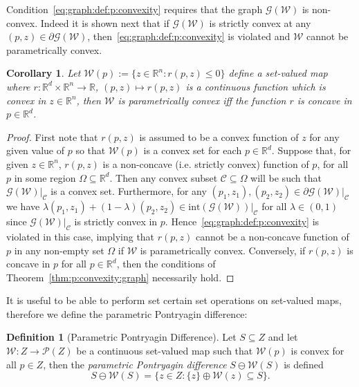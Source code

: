 \documentclass{elsarticle}
\newcounter{thmcount}
\newtheorem{cor}[thmcount]{Corollary}
\theoremstyle{remark}
\theoremstyle{definition}
\newtheorem{defi}[thmcount]{Definition}
\begin{document}
Condition~\eqref{eq:graph:def:p:convexity} requires that the graph $\mathscr G(\mathcal W)$ is non-convex.
%
Indeed it is shown next that if $\mathscr G(\mathcal W)$ is strictly convex at any $(p,z)\in\partial \mathscr G (\mathcal W)$, then~\eqref{eq:graph:def:p:convexity} is violated and 
$\mathcal W$ cannot be parametrically convex.

%
\begin{cor}\label{thm:inequalities:convex:concave}
%
Let $\mathcal W(p):=\{z\in\mathbb R^n: r(p,z)\leq0\}$ define a set-valued
map where 
$r: \mathbb R^d \times\mathbb R^n \rightarrow \mathbb R$, $(p,z)\mapsto r(p,z)$ is a continuous function which is convex in $z \in\mathbb R^n$, 
then $\mathcal W$ is parametrically
convex iff the function $r$ is concave in $p\in\mathbb R^d$.
%
\end{cor}
%
\begin{proof}
First note that $r(p,z)$ is assumed to be a convex function of $z$ for any given value of $p$ so that $\mathcal W(p)$ is a convex set for each $p\in\mathbb R^d$.
%
Suppose that, for given $z\in\mathbb R^n$, $r(p,z)$ is a non-concave (i.e. 
strictly convex) function of $p$, for all $p$ in some region $\Omega\subseteq\mathbb R^d$. 
%
Then any convex subset $\mathcal C\subseteq\Omega$ will be such that $\mathscr 
G(\mathcal W)\vert_{\mathcal C}$ is a convex set.
%
Furthermore, for any $(p_1,z_1),(p_2,z_2)\in \partial\mathscr G(\mathcal W)\vert_{\mathcal C}$ we have
$\lambda (p_1,z_1) + (1-\lambda) (p_2,z_2) \in\mathrm{int} (\mathscr G(\mathcal W))\vert_{\mathcal C}$ for all $\lambda\in(0,1)$ since
$\mathscr G(\mathcal W)\vert_{\mathcal C}$ is strictly convex in $p$.
%
Hence~\eqref{eq:graph:def:p:convexity} is violated in this case, implying that $r(p,z)$ cannot be a non-concave function of $p$ in any non-empty set $\Omega$ if $\mathcal W$ is parametrically convex. 
%
Conversely, if $r(p,z)$ is concave in $p$ for all $p\in\mathbb R^d$, then the conditions of Theorem~\ref{thm:p:convexity:graph} necessarily hold.
\end{proof}
%
It is useful to be able to perform set certain set operations on set-valued maps, therefore we define the parametric Pontryagin difference:
%
\begin{defi}[Parametric Pontryagin Difference]\label{def:parametric:pontryagin:difference}
  Let $S\subseteq Z$ and let $\mathcal W:Z\to\mathscr P(Z)$ be a continuous set-valued map such that
  $\mathcal W(p)$ is convex for all $p\in Z$, then the \emph{parametric Pontryagin difference} 
  $S\ominus \mathcal W(S)$ is defined
%
\begin{equation}\label{eq:definition:parametric:pontryagin:difference}
    S\ominus \mathcal W(S) = \bigl\{z\in Z: \{z\} \oplus \mathcal W(z)\subseteq S\bigr\}.
  \end{equation}
%
\end{defi}
\end{document}
